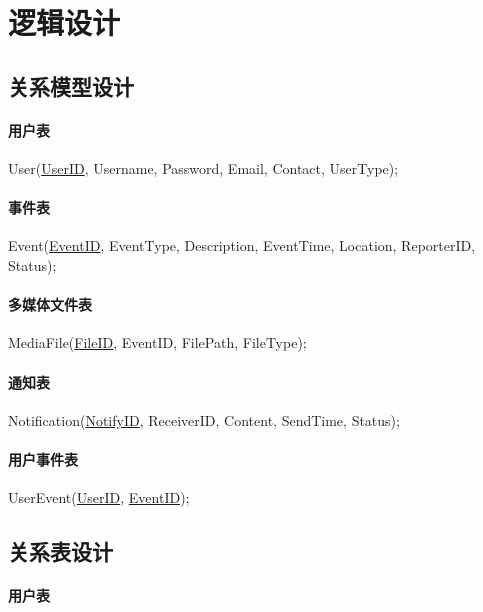 \section{逻辑设计}

\subsection{关系模型设计}

\paragraph{用户表}

User(\underline{UserID}, Username, Password, Email, Contact, UserType);

\paragraph{事件表}

Event(\underline{EventID}, EventType, Description, EventTime, Location, ReporterID, Status);

\paragraph{多媒体文件表}

MediaFile(\underline{FileID}, EventID, FilePath, FileType);

\paragraph{通知表}

Notification(\underline{NotifyID}, ReceiverID, Content, SendTime, Status);

\paragraph{用户事件表}

UserEvent(\underline{UserID}, \underline{EventID});

\subsection{关系表设计}

\paragraph{用户表}


